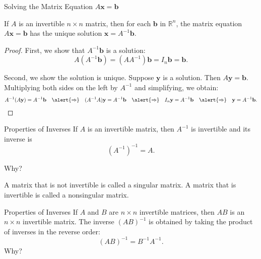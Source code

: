 \documentclass[xcolor=dvipsnames,aspectratio=169,t]{beamer}
\begin{document}
\begin{frame}{Solving the Matrix Equation $A\mathbf{x}=\mathbf{b}$}
  \begin{theorem}
    If $A$ is an invertible $n\times n$ matrix, then for each $\mathbf{b}$ in $\mathbb{R}^n$,
    the matrix equation $A\mathbf{x}=\mathbf{b}$ has the \alert{unique solution} $\mathbf{x}=A^{-1}\mathbf{b}$.
  \end{theorem}
  
  \begin{proof}
  \pause
    First, we show that $A^{-1}\mathbf{b}$ is a solution:
    \[
      A(A^{-1}\mathbf{b})=(AA^{-1})\mathbf{b}=I_n \mathbf{b} = \mathbf{b}.
    \]
    
  \pause
    Second, we show the solution is unique.  Suppose $\mathbf{y}$ is a solution.
    Then $A\mathbf{y}=\mathbf{b}$.
    Multiplying both sides on the left by $A^{-1}$ and simplifying, we obtain:
    \[
      A^{-1}(A\mathbf{y})=A^{-1}\mathbf{b}
      \quad\alert{\Rightarrow}\quad
      (A^{-1}A)\mathbf{y}=A^{-1}\mathbf{b}
      \quad\alert{\Rightarrow}\quad
      I_n \mathbf{y}=A^{-1}\mathbf{b}
      \quad\alert{\Rightarrow}\quad
      \mathbf{y}=A^{-1}\mathbf{b}.
    \]
  \end{proof}

  
\end{frame}


\begin{frame}{Properties of Inverses}
  \bbox
  If $A$ is an invertible matrix, then $A^{-1}$ is invertible and its inverse is 
  \[ \left( A^{-1} \right)^{-1} = A .\]
  \ebox
  
  Why?

  \vspace{5em}
  
  \bbox
  \bi 
  \ii A matrix that is \alert{not invertible} is called a \alert{singular matrix}.
  \ii A matrix that \alert{is invertible} is called a \alert{nonsingular matrix}.
  \ei
  \ebox
\end{frame}

\begin{frame}{Properties of Inverses}
  \bbox
  If $A$ and $B$ are $n \times n$ invertible matrices, then $AB$ is an $n \times n$ invertible matrix. The inverse $(AB)^{-1}$ is obtained by taking the \alert{product of inverses in the reverse order}:
  \[ (AB)^{-1} = B^{-1} A^{-1}.\]
  \ebox
  Why?

  \vspace{5em}

\end{frame}
\end{document}
